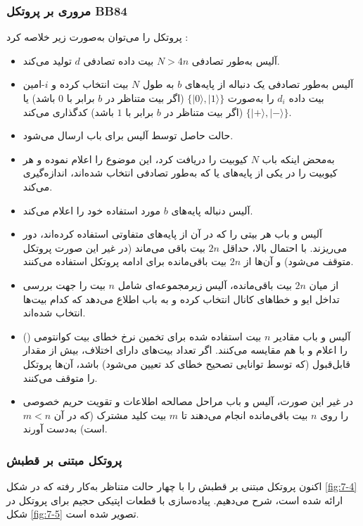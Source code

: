 \subsubsection{مروری بر پروتکل BB84}
\label{subsec:7-3-1-2}
پروتکل  را می‌توان به‌صورت زیر خلاصه کرد \cite{7-6}:
\begin{itemize}
	\item آلیس به‌طور تصادفی $N > 4n$ بیت داده تصادفی $d$ تولید می‌کند.
	\item آلیس به‌طور تصادفی یک دنباله از پایه‌های $b$ به طول $N$ بیت انتخاب کرده و $i$-امین بیت داده $d_i$ را به‌صورت $\{|0\rangle, |1\rangle\}$ (اگر بیت متناظر در $b$ برابر با $0$ باشد) یا $\{|+\rangle, |-\rangle\}$ (اگر بیت متناظر در $b$ برابر با $1$ باشد) کدگذاری می‌کند.
	\item حالت حاصل توسط آلیس برای باب ارسال می‌شود.
	\item به‌محض اینکه باب $N$ کیوبیت را دریافت کرد، این موضوع را اعلام نموده و هر کیوبیت را در یکی از پایه‌های  یا  که به‌طور تصادفی انتخاب شده‌اند، اندازه‌گیری می‌کند.
	\item آلیس دنباله پایه‌های $b$ مورد استفاده خود را اعلام می‌کند.
	\item آلیس و باب هر بیتی را که در آن از پایه‌های متفاوتی استفاده کرده‌اند، دور می‌ریزند. با احتمال بالا، حداقل $2n$ بیت باقی می‌ماند (در غیر این صورت پروتکل متوقف می‌شود) و آن‌ها از $2n$ بیت باقی‌مانده برای ادامه پروتکل استفاده می‌کنند.
	\item از میان $2n$ بیت باقی‌مانده، آلیس زیرمجموعه‌ای شامل $n$ بیت را جهت بررسی تداخل ایو و خطاهای کانال انتخاب کرده و به باب اطلاع می‌دهد که کدام بیت‌ها انتخاب شده‌اند.
	\item آلیس و باب مقادیر $n$ بیت استفاده شده برای تخمین نرخ خطای بیت کوانتومی () را اعلام و با هم مقایسه می‌کنند. اگر تعداد بیت‌های دارای اختلاف، بیش از مقدار قابل‌قبول (که توسط توانایی تصحیح خطای کد تعیین می‌شود) باشد، آن‌ها پروتکل را متوقف می‌کنند.
	\item در غیر این صورت، آلیس و باب مراحل مصالحه اطلاعات و تقویت حریم خصوصی را روی $n$ بیت باقی‌مانده انجام می‌دهند تا $m$ بیت کلید مشترک (که در آن $m < n$ است) به‌دست آورند.
\end{itemize}








\subsubsection{پروتکل   مبتنی بر قطبش}
\label{subsec:7-3-1-3}
اکنون پروتکل   مبتنی بر قطبش را با چهار حالت متناظر به‌کار رفته که در شکل \ref{fig:7-4} ارائه شده است، شرح می‌دهیم. پیاده‌سازی با قطعات اپتیکی حجیم برای پروتکل  در شکل \ref{fig:7-5} تصویر شده است.


